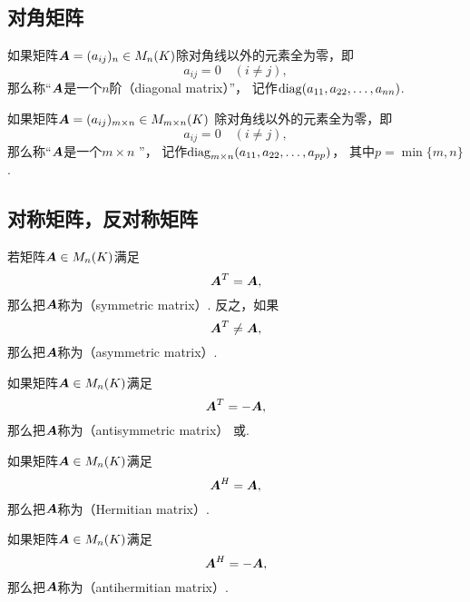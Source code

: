 \subsection{对角矩阵}
\begin{definition}
如果矩阵\(\boldsymbol{A}=(a_{ij})_n \in M_n(K)\)除对角线以外的元素全为零，即\[
	a_{ij} = 0
	\quad(i \neq j),
\]
那么称“\(\boldsymbol{A}\)是一个\(n\)阶（diagonal matrix）”，
记作\(\operatorname{diag}(a_{11},a_{22},\dotsc,a_{nn})\).
\end{definition}

\begin{definition}
如果矩阵\(\boldsymbol{A}=(a_{ij})_{m \times n} \in M_{m \times n}(K)\)
除对角线以外的元素全为零，即\[
	a_{ij} = 0
	\quad(i \neq j),
\]
那么称“\(\boldsymbol{A}\)是一个\(m \times n\) ”，
记作\(\operatorname{diag}_{m \times n}(a_{11},a_{22},\dotsc,a_{pp})\)，
其中\(p = \min\{m,n\}\).
\end{definition}

\subsection{对称矩阵，反对称矩阵}
\begin{definition}
若矩阵\(\boldsymbol{A} \in M_n(K)\)满足\[
    \boldsymbol{A}^T = \boldsymbol{A},
\]
那么把\(\boldsymbol{A}\)称为（symmetric matrix）.
反之，如果\[
	\boldsymbol{A}^T \neq \boldsymbol{A},
\]
那么把\(\boldsymbol{A}\)称为（asymmetric matrix）.
\end{definition}

\begin{definition}
如果矩阵\(\boldsymbol{A} \in M_n(K)\)满足\[
	\boldsymbol{A}^T = -\boldsymbol{A},
\]
那么把\(\boldsymbol{A}\)称为（antisymmetric matrix）
或.
\end{definition}

\begin{definition}
如果矩阵\(\boldsymbol{A} \in M_n(K)\)满足\[
    \boldsymbol{A}^H = \boldsymbol{A},
\]
那么把\(\boldsymbol{A}\)称为（Hermitian matrix）.
\end{definition}

\begin{definition}
如果矩阵\(\boldsymbol{A} \in M_n(K)\)满足\[
	\boldsymbol{A}^H = -\boldsymbol{A},
\]
那么把\(\boldsymbol{A}\)称为（antihermitian matrix）.
\end{definition}

